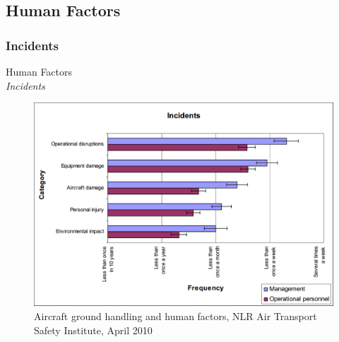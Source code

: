 \subsection{Human Factors}

\subsubsection{Incidents}
\begin{frame}{Human Factors\\\textit{Incidents}}{}
	\begin{figure}[H]
	\centering
	\includegraphics[width=\textwidth]{Grafik/FrequencyOfIncidents}
	\caption{\footnotesize Aircraft ground handling and human factors, NLR Air Transport Safety Institute, April 2010}
\end{figure}
\end{frame}

